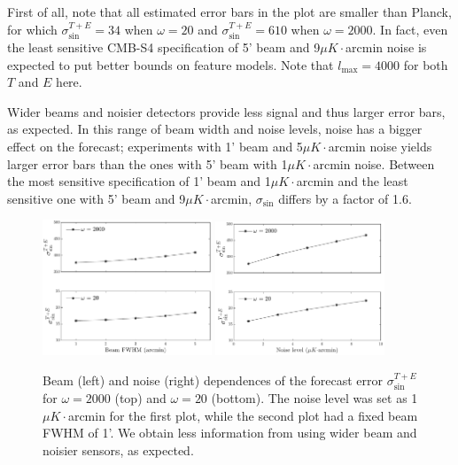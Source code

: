First of all, note that all estimated error bars in the plot are smaller than Planck, for which $\sigma_{\sin}^{T+E}=34$ when $\omega=20$ and $\sigma_{\sin}^{T+E}=610$ when $\omega=2000$. In fact, even the least sensitive CMB-S4 specification of 5' beam and 9$\mu K\cdot$arcmin noise is expected to put better bounds on feature models. Note that $l_\text{max}=4000$ for both $T$ and $E$ here.

Wider beams and noisier detectors provide less signal and thus larger error bars, as expected. In this range of beam width and noise levels, noise has a bigger effect on the forecast; experiments with 1' beam and 5$\mu K\cdot$arcmin noise yields larger error bars than the ones with 5' beam with 1$\mu K\cdot$arcmin noise. Between the most sensitive specification of 1' beam and 1$\mu K\cdot$arcmin and the least sensitive one with 5' beam and 9$\mu K\cdot$arcmin, $\sigma_{\sin}$ differs by a factor of 1.6.


\begin{figure}[ht]
	\centering
	\includegraphics[width=0.45\textwidth]{beam_dependence.pdf}
	\includegraphics[width=0.45\textwidth]{noise_dependence.pdf}
	\caption{Beam (left) and noise (right) dependences of the forecast error $\sigma_{\sin}^{T+E}$ for $\omega=2000$ (top) and $\omega=20$ (bottom). The noise level was set as 1$\mu K \cdot$arcmin for the first plot, while the second plot had a fixed beam FWHM of 1'. We obtain less information from using wider beam and noisier sensors, as expected.}
	\label{forecast beam and noise dependence}
\end{figure}

